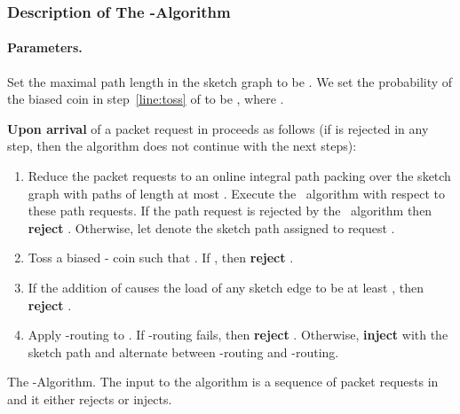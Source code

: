 \documentclass[11pt]{article}
\newcommand{\route}{\text{\sc{ipp}}}
\newenvironment{proof sketch}[1]{\noindent {\emph{Proof sketch of #1:}}}{\hfill \qed}
\begin{document}
\subsubsection{Description of The -Algorithm}
\paragraph{Parameters.}
Set the maximal path length in the sketch graph to be . We set
the probability  of the biased coin in step~\ref{line:toss} of
 to be , where .

\begin{algorithm}
    \textbf{Upon arrival} of a packet request  in 
    proceeds as follows (if  is rejected in any step, then the algorithm does not continue with the next steps):
\begin{enumerate}
\item
\label{line:IPP}


Reduce the packet requests to an online integral path
packing over the sketch graph with paths of length at
most . Execute the \route\ algorithm with respect
to these path requests. If the path request is rejected
by the \route\ algorithm then \textbf{reject} .
Otherwise, let  denote the sketch path assigned
to request .

\item \label{line:toss} Toss a biased - coin  such that
  . If , then \textbf{reject} .
\item
\label{line:load}\label{item:quarter}
If the addition of  causes the load of any sketch edge to be at least
, then \textbf{reject} .
\item\label{line:I} Apply -routing to .  If -routing fails,
  then \textbf{reject} . Otherwise, \textbf{inject}  with
  the sketch path  and alternate between -routing and
  -routing.
\end{enumerate}
\caption{The -Algorithm. The input to the algorithm is a sequence of packet requests in  and it either rejects or injects.}\label{alg:algRand}
\end{algorithm}
\end{document}
